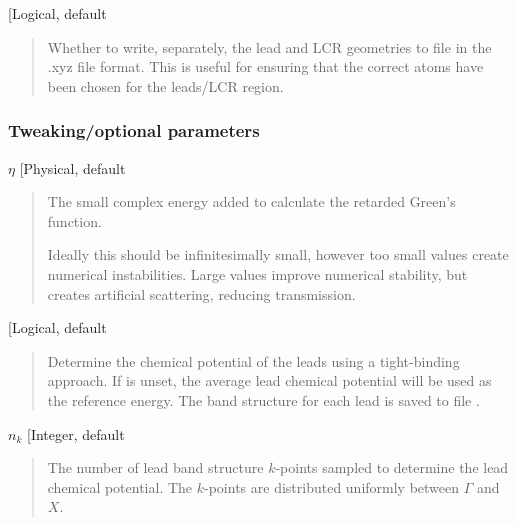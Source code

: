 \documentclass[letterpaper,10pt,english]{sphinxmanual}
\begin{document}
 {[}Logical, default \sphinxcode{etrans\_write\_xyz : T}{]}
\begin{quote}

\begin{DUlineblock}{0em}
\item[] Whether to write, separately, the lead and LCR geometries to file in
the .xyz file format. This is useful for ensuring that the correct
atoms have been chosen for the leads/LCR region.
\end{DUlineblock}
\end{quote}


\subsubsection{Tweaking/optional parameters}
\label{\detokenize{transport:tweaking-optional-parameters}}
 \(\eta\) {[}Physical, default \sphinxcode{etrans\_ecmplx: 1e-6 Hartree}{]}
\begin{quote}

\begin{DUlineblock}{0em}
\item[] The small complex energy added to calculate the retarded Green’s
function.
\item[] Ideally this should be infinitesimally small, however too small values
create numerical instabilities. Large values improve numerical
stability, but creates artificial scattering, reducing transmission.
\end{DUlineblock}
\end{quote}

 {[}Logical, default \sphinxcode{etrans\_calculate\_lead\_mu: T}{]}
\begin{quote}

\begin{DUlineblock}{0em}
\item[] Determine the chemical potential of the leads using a tight-binding
approach. If  is unset, the average lead chemical
potential will be used as the reference energy. The band structure for
each lead is saved to file .
\end{DUlineblock}
\end{quote}

 \(n_k\) {[}Integer, default \sphinxcode{etrans\_num\_lead\_kpoints: 32}{]}
\begin{quote}

\begin{DUlineblock}{0em}
\item[] The number of lead band structure \(k\)-points sampled to
determine the lead chemical potential. The \(k\)-points are
distributed uniformly between \(\Gamma\) and \(X\).
\end{DUlineblock}
\end{quote}
\end{document}
